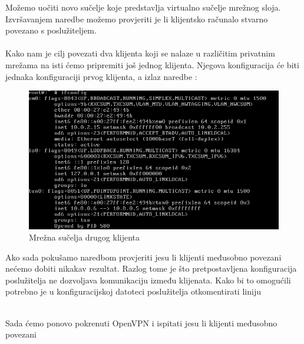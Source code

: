         Možemo uočiti novo sučelje  koje predstavlja virtualno
        sučelje mrežnog sloja. Izvršavanjem naredbe  možemo provjeriti je
        li klijentsko računalo stvarno povezano s poslužiteljem. \\

        \noindent
         \\

        Kako nam je cilj povezati dva klijenta koji se nalaze u različitim
        privatnim mrežama na isti ćemo pripremiti još jednog klijenta. Njegova
        konfiguracija će biti jednaka konfiguraciji prvog klijenta, a izlaz
        naredbe :
        \begin{figure}[H]
            \centering
            \includegraphics[scale=0.45]{slike/client2Ifconfig}
            \caption{Mrežna sučelja drugog klijenta}
        \end{figure}

        \noindent
        Ako sada pokušamo naredbom
        provjeriti jesu li klijenti međusobno povezani nećemo dobiti nikakav
        rezultat. Razlog tome je što pretpostavljena konfiguracija poslužitelja
        ne dozvoljava komunikaciju između klijenata. Kako bi to omogućili
        potrebno je u konfiguracijskoj datoteci poslužitelja otkomentirati liniju 

        \noindent 
         \\

        \noindent
        Sada ćemo ponovo pokrenuti OpenVPN i ispitati jesu li klijenti
        međusobno povezani \\

